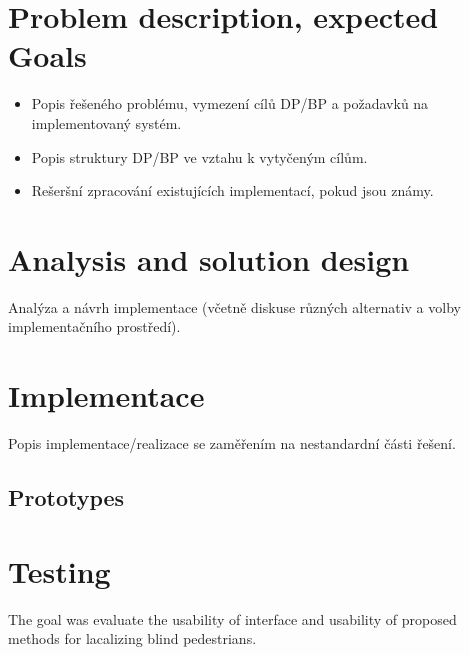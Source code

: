 \documentclass[11pt,twoside,a4paper]{book}
\begin{document}
	\chapter{Problem description, expected Goals}
	
	\begin{itemize}
		\item Popis řešeného problému, vymezení cílů DP/BP a požadavků na implementovaný systém.
		\item Popis struktury DP/BP ve vztahu k vytyčeným cílům.
		\item Rešeršní zpracování existujících implementací, pokud jsou známy.
	\end{itemize}
	
	\chapter{Analysis and solution design}
	Analýza a návrh implementace (včetně diskuse různých alternativ a volby implementačního prostředí).
	
	
	\chapter{Implementace}
	Popis implementace/realizace se zaměřením na nestandardní části řešení.
	\section{Prototypes} \label{sec:prototypes}
	
	
	\chapter{Testing}
	The goal was evaluate the usability of interface and usability of proposed methods for lacalizing blind pedestrians. 
	
\end{document}
